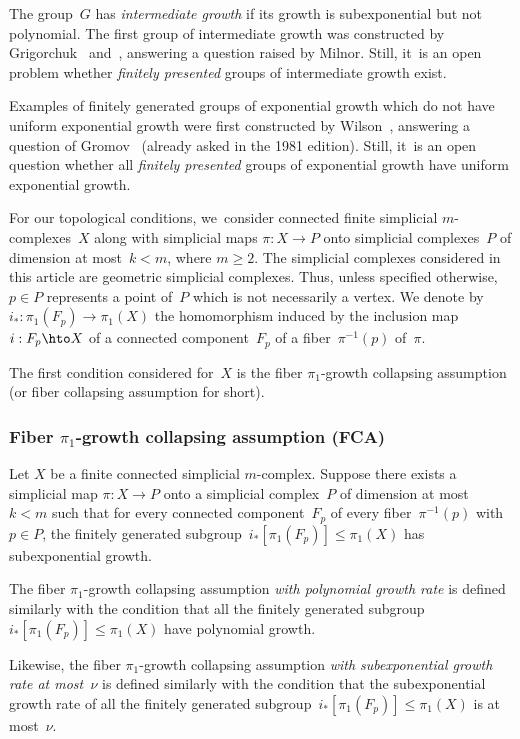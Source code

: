 \begin{definition}
The group~$G$ has \emph{intermediate growth} if its growth is subexponential but not polynomial.
The first group of intermediate growth was constructed by Grigorchuk~\cite{grigorchuk} and~\cite{grigorchuk2}, answering a question raised by Milnor.
Still, it~is an open problem whether \emph{finitely presented} groups of intermediate growth exist.

Examples of finitely generated groups of exponential growth which do not have uniform exponential growth were first constructed by Wilson~\cite{Wilson04}, answering a question of Gromov~\cite[Rem.\,5.12]{gro99} (already asked in the 1981 edition).
Still, it~is an open question whether all \emph{finitely presented} groups of exponential growth have uniform exponential growth.
\end{definition}

For our topological conditions, we~consider connected finite simplicial $m$\nobreakdash-com\-plexes~$X$ along with simplicial maps $\pi:X \to P$ onto simplicial complexes~$P$ of dimension at most~$k<m$, where $m \geq 2$. The simplicial complexes considered in this article are geometric simplicial complexes.
Thus, unless specified otherwise, $p \in P$ represents a point of~$P$ which is not necessarily a vertex.
We denote by $i_*:\pi_1(F_p) \to \pi_1(X)$ the homomorphism induced by the inclusion map $i:F_p \hto X$ of a connected component~$F_p$ of a fiber~$\pi^{-1}(p)$ of~$\pi$.

The first condition considered for~$X$ is the fiber $\pi_1$-growth collapsing assumption (or fiber collapsing assumption for short).

\subsubsection*{Fiber $\pi_1$-growth collapsing assumption (FCA)}
Let $X$ be a finite connected simplicial $m$\nobreakdash-complex.
Suppose there exists a simplicial map \mbox{$\pi:X \to P$} onto a simplicial complex~$P$ of dimension at most~$k<m$ such that for every connected component~$F_p$ of every fiber~$\pi^{-1}(p)$ with $p \in P$, the finitely generated subgroup~$i_*[\pi_1(F_p)] \leqslant \pi_1(X)$ has subexponential growth.

The fiber $\pi_1$-growth collapsing assumption \emph{with polynomial growth rate} is defined similarly with the condition that all the finitely generated subgroup~$i_*[\pi_1(F_p)] \leqslant \pi_1(X)$ have polynomial growth.

Likewise, the fiber $\pi_1$-growth collapsing assumption \emph{with subexponential growth rate at most~$\nu$} is defined similarly with the condition that the subexponential growth rate of all the finitely generated subgroup~$i_*[\pi_1(F_p)] \leqslant \pi_1(X)$ is at most~$\nu$.

